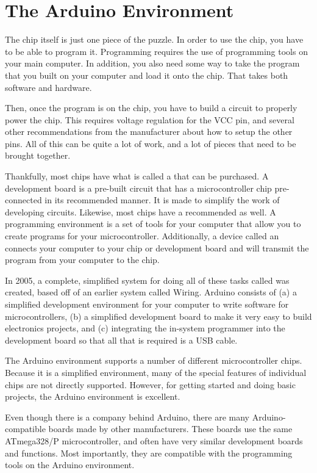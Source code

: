 \section{The Arduino Environment}

The chip itself is just one piece of the puzzle.
In order to use the chip, you have to be able to program it.
Programming requires the use of programming tools on your main computer.
In addition, you also need some way to take the program that you built on your computer and load it onto the chip.
That takes both software and hardware.

Then, once the program is on the chip, you have to build a circuit to properly power the chip.
This requires voltage regulation for the VCC pin, and several other recommendations from the manufacturer about how to setup the other pins.  
All of this can be quite a lot of work, and a lot of pieces that need to be brought together.

Thankfully, most chips have what is called a  that can be purchased.
A development board is a pre-built circuit that has a microcontroller chip pre-connected in its recommended manner.
It is made to simplify the work of developing circuits.
Likewise, most chips have a recommended  as well.
A programming environment is a set of tools for your computer that allow you to create programs for your microcontroller.
Additionally, a device called an  connects your computer to your chip or development board and will transmit the program from your computer to the chip.

In 2005, a complete, simplified system for doing all of these tasks called  was created, based off of an earlier system called Wiring.
Arduino consists of (a) a simplified development environment for your computer to write software for microcontrollers, (b) a simplified development board to make it very easy to build electronics projects, and (c) integrating the in-system programmer into the development board so that all that is required is a USB cable.

The Arduino environment supports a number of different microcontroller chips.
Because it is a simplified environment, many of the special features of individual chips are not directly supported.
However, for getting started and doing basic projects, the Arduino environment is excellent.

Even though there is a company behind Arduino, there are many Arduino-compatible boards made by other manufacturers.
These boards use the same ATmega328/P microcontroller, and often have very similar development boards and functions.
Most importantly, they are compatible with the programming tools on the Arduino environment.

